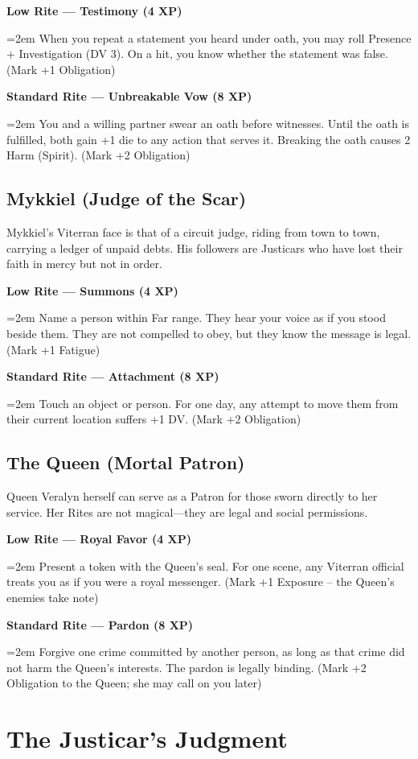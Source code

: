 \documentclass[11pt,twoside]{book}
\newcommand{\legalitem}[1]{\par\noindent\textbf{#1}\par\noindent\hangindent=2em\hangafter=1}
\newcommand{\ornament}{\par\centering\adforn{36}\par}
\begin{document}
\legalitem{Low Rite --- Testimony (4 XP)} When you repeat a statement you heard under oath, you may roll Presence + Investigation (DV 3). On a hit, you know whether the statement was false. (Mark +1 Obligation)

\legalitem{Standard Rite --- Unbreakable Vow (8 XP)} You and a willing partner swear an oath before witnesses. Until the oath is fulfilled, both gain +1 die to any action that serves it. Breaking the oath causes 2 Harm (Spirit). (Mark +2 Obligation)

\section{Mykkiel (Judge of the Scar)}

Mykkiel's Viterran face is that of a circuit judge, riding from town to town, carrying a ledger of unpaid debts. His followers are Justicars who have lost their faith in mercy but not in order.

\legalitem{Low Rite --- Summons (4 XP)} Name a person within Far range. They hear your voice as if you stood beside them. They are not compelled to obey, but they know the message is legal. (Mark +1 Fatigue)

\legalitem{Standard Rite --- Attachment (8 XP)} Touch an object or person. For one day, any attempt to move them from their current location suffers +1 DV. (Mark +2 Obligation)

\section{The Queen (Mortal Patron)}

Queen Veralyn herself can serve as a Patron for those sworn directly to her service. Her Rites are not magical---they are legal and social permissions.

\legalitem{Low Rite --- Royal Favor (4 XP)} Present a token with the Queen's seal. For one scene, any Viterran official treats you as if you were a royal messenger. (Mark +1 Exposure -- the Queen's enemies take note)

\legalitem{Standard Rite --- Pardon (8 XP)} Forgive one crime committed by another person, as long as that crime did not harm the Queen's interests. The pardon is legally binding. (Mark +2 Obligation to the Queen; she may call on you later)

\ornament

\chapter{The Justicar's Judgment}
\end{document}
